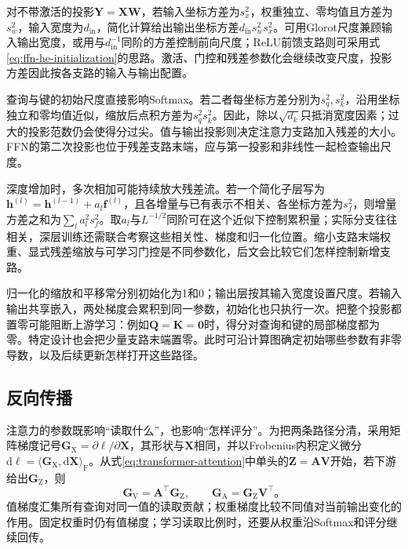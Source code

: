 对不带激活的投影$\bm Y=\bm X\bm W$，若输入坐标方差为$s_x^2$，权重独立、零均值且方差为$s_w^2$，输入宽度为$d_{\mathrm{in}}$，简化计算给出输出坐标方差$d_{\mathrm{in}}s_w^2s_x^2$。可用Glorot尺度兼顾输入输出宽度，或用与$d_{\mathrm{in}}^{-1}$同阶的方差控制前向尺度；ReLU前馈支路则可采用式\eqref{eq:ffn-he-initialization}的思路。激活、门控和残差参数化会继续改变尺度，投影方差因此按各支路的输入与输出配置。

查询与键的初始尺度直接影响Softmax。若二者每坐标方差分别为$s_q^2,s_k^2$，沿用坐标独立和零均值近似，缩放后点积方差为$s_q^2s_k^2$。因此，除以$\sqrt{d_k}$只抵消宽度因素；过大的投影范数仍会使得分过尖。值与输出投影则决定注意力支路加入残差的大小。FFN的第二次投影也位于残差支路末端，应与第一投影和非线性一起检查输出尺度。

深度增加时，多次相加可能持续放大残差流。若一个简化子层写为$\bm h^{(l)}=\bm h^{(l-1)}+a_l\bm f^{(l)}$，且各增量与已有表示不相关、各坐标方差为$s_f^2$，则增量方差之和为$\sum_l a_l^2s_f^2$。取$a_l$与$L^{-1/2}$同阶可在这个近似下控制累积量；实际分支往往相关，深层训练还需联合考察这些相关性、梯度和归一化位置。缩小支路末端权重、显式残差缩放与可学习门控是不同参数化，后文会比较它们怎样控制新增支路。

归一化的缩放和平移常分别初始化为1和0；输出层按其输入宽度设置尺度。若输入输出共享嵌入，两处梯度会累积到同一参数，初始化也只执行一次。把整个投影都置零可能阻断上游学习：例如$\bm Q=\bm K=\bm0$时，得分对查询和键的局部梯度都为零。特定设计也会把少量支路末端置零。此时可沿计算图确定初始哪些参数有非零导数，以及后续更新怎样打开这些路径。

\subsection{反向传播}
\label{sec:transformer-backpropagation}

注意力的参数既影响“读取什么”，也影响“怎样评分”。为把两条路径分清，采用矩阵梯度记号$\bm G_{\mathrm X}=\partial\ell/\partial\bm X$，其形状与$\bm X$相同，并以Frobenius内积定义微分$\mathrm d\ell=\langle\bm G_{\mathrm X},\mathrm d\bm X\rangle_{\mathrm F}$。从式\eqref{eq:transformer-attention}中单头的$\bm Z=\bm A\bm V$开始，若下游给出$\bm G_{\mathrm Z}$，则
\begin{equation}
  \bm G_{\mathrm V}=\bm A^{\top}\bm G_{\mathrm Z},\qquad
  \bm G_{\mathrm A}=\bm G_{\mathrm Z}\bm V^{\top}\text{。}
  \label{eq:transformer-aggregation-gradient}
\end{equation}
值梯度汇集所有查询对同一值的读取贡献；权重梯度比较不同值对当前输出变化的作用。固定权重时仍有值梯度；学习读取比例时，还要从权重沿Softmax和评分继续回传。

